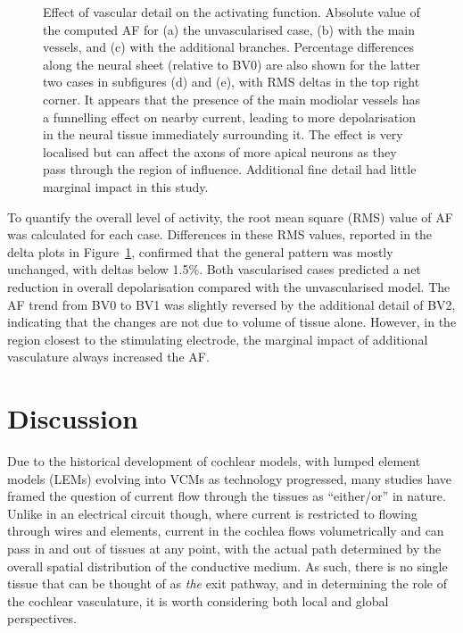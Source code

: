 \begin{figure}
    \caption[Effect of vascular detail on the activating function]{Effect of
    vascular detail on the activating function. Absolute value of the
    computed AF for (a) the unvascularised case, (b) with the main vessels, and
    (c) with the additional branches. Percentage differences along the neural
    sheet (relative to BV0) are also shown for the latter two cases in
    subfigures (d) and (e), with RMS deltas in the top right corner.
    It appears that the presence of the main modiolar vessels has a funnelling
    effect on nearby current, leading to more depolarisation in the neural
    tissue immediately surrounding it. The effect is very localised but can
    affect the axons of more apical neurons as they pass through the region of
    influence. Additional fine detail had little marginal impact in this study.}
	\label{fig:vasc_af}
\end{figure}

To quantify the overall level of activity, the root mean square (RMS) value of
AF was calculated for each case. Differences in these RMS values, reported in
the delta plots in Figure~\ref{fig:vasc_af}, confirmed that the general pattern
was mostly unchanged, with deltas below 1.5\%. Both vascularised cases predicted
a net reduction in overall depolarisation compared with the unvascularised
model. The AF trend from BV0 to BV1 was slightly reversed by the additional
detail of BV2, indicating that the changes are not due to volume of tissue
alone. However, in the region closest to the stimulating electrode, the
marginal impact of additional vasculature always increased the AF.

\section{Discussion}

Due to the historical development of cochlear models, with lumped element models
(LEMs) evolving into VCMs as technology progressed, many studies have framed the
question of current flow through the tissues as ``either/or'' in nature. Unlike
in an electrical circuit though, where current is restricted to flowing through
wires and elements, current in the cochlea flows volumetrically and can pass in
and out of tissues at any point, with the actual path determined by the overall
spatial distribution of the conductive medium. As such, there is no single
tissue that can be thought of as \emph{the} exit pathway, and in determining the
role of the cochlear vasculature, it is worth considering both local and global
perspectives.

